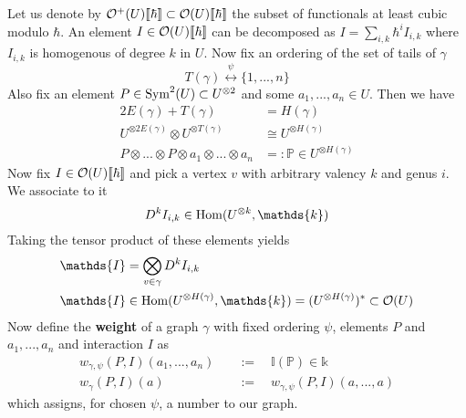 \begin{definition}
  Let us denote by $\mathcal{O}^+(U) \llbracket \hbar \rrbracket \subset \mathcal{O}(U) \llbracket \hbar \rrbracket$ the subset of functionals at least cubic modulo $\hbar$. An element $I \in \mathcal{O}(U) \llbracket \hbar \rrbracket$ can be decomposed as $I = \sum_{i,k} \hbar^i I_{i,k}$ where $I_{i,k}$ is homogenous of degree $k$ in $U$. Now fix an ordering of the set of tails of $\gamma$
  \begin{equation}T(\gamma) \overset{\psi}{\longleftrightarrow} \{1, ..., n\}\end{equation}
  Also fix an element $P \in \operatorname{Sym}^2(U) \subset U^{\otimes 2}$ and some $a_1, ..., a_n \in U$. Then we have
  \begin{align}
    2 E(\gamma) + T(\gamma) &= H(\gamma) \\
    U^{\otimes 2 E(\gamma)} \otimes U^{\otimes T(\gamma)} &\cong U^{\otimes H(\gamma)} \\
    P \otimes ... \otimes P \otimes a_1 \otimes ... \otimes a_n &=: \mathds{P} \in U^{\otimes H(\gamma)}
  \end{align}
  Now fix $I \in \mathcal{O}(U) \llbracket \hbar \rrbracket$ and pick a vertex $v$ with arbitrary valency $k$ and genus $i$. We associate to it
  \begin{equation}D^k I_{i,k} \in \Hom(U^{\otimes k}, \mathds{k})\end{equation}
  Taking the tensor product of these elements yields
  \begin{align}
    \mathds{I} &= \bigotimes_{v \in \gamma} D^k I_{i,k}\\
    \mathds{I} &\in \Hom(U^{\otimes H(\gamma)}, \mathds{k}) = (U^{\otimes H(\gamma)})^* \subset \OO(U)
  \end{align}
  Now define the \textbf{weight} of a graph $\gamma$ with fixed ordering $\psi$, elements $P$ and $a_1, ..., a_n$ and interaction $I$ as
  \begin{align}
    w_{\gamma, \psi} (P,I) (a_1, ..., a_n) \quad &:= \quad \mathds{I}(\mathds{P}) \in \mathds{k} \\
    w_\gamma (P,I) (a) \quad &:= \quad w_{\gamma,\psi} (P,I)(a, ..., a)
  \end{align}
  which assigns, for chosen $\psi$, a number to our graph.
\end{definition}

